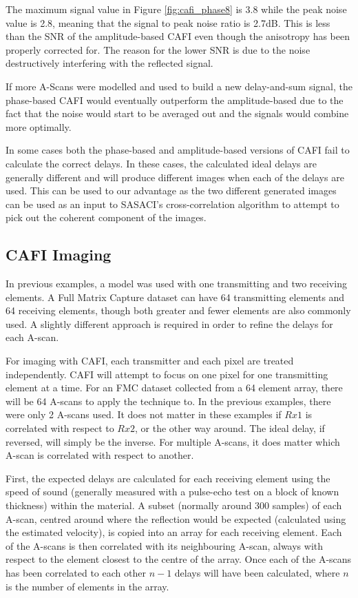 The maximum signal value in Figure \ref{fig:cafi_phase8} is 3.8 while the peak noise value is 2.8, meaning that the signal to peak noise ratio is 2.7dB. This is less than the SNR of the amplitude-based CAFI even though the anisotropy has been properly corrected for. The reason for the lower SNR is due to the noise destructively interfering with the reflected signal. 

If more A-Scans were modelled and used to build a new delay-and-sum signal, the phase-based CAFI would eventually outperform the amplitude-based due to the fact that the noise would start to be averaged out and the signals would combine more optimally. 

In some cases both the phase-based and amplitude-based versions of CAFI fail to calculate the correct delays. In these cases, the calculated ideal delays are generally different and will produce different images when each of the delays are used. This can be used to our advantage as the two different generated images can be used as an input to SASACI's cross-correlation algorithm\cite{lardner_new_2013} to attempt to pick out the coherent component of the images.


\subsection{CAFI Imaging}

In previous examples, a model was used with one transmitting and two receiving elements. A Full Matrix Capture dataset can have 64 transmitting elements and 64 receiving elements, though both greater and fewer elements are also commonly used. A slightly different approach is required in order to refine the delays for each A-scan.

For imaging with CAFI, each transmitter and each pixel are treated independently. CAFI will attempt to focus on one pixel for one transmitting element at a time. For an FMC dataset collected from a 64 element array, there will be 64 A-scans to apply the technique to. In the previous examples, there were only 2 A-scans used. It does not matter in these examples if $Rx1$ is correlated with respect to $Rx2$, or the other way around. The ideal delay, if reversed, will simply be the inverse. For multiple A-scans, it does matter which A-scan is correlated with respect to another.

First, the expected delays are calculated for each receiving element using the speed of sound (generally measured with a pulse-echo test on a block of known thickness) within the material. A subset (normally around 300 samples) of each A-scan, centred around where the reflection would be expected (calculated using the estimated velocity), is copied into an array for each receiving element. Each of the A-scans is then correlated with its neighbouring A-scan, always with respect to the element closest to the centre of the array. Once each of the A-scans has been correlated to each other $n-1$ delays will have been calculated, where $n$ is the number of elements in the array.

